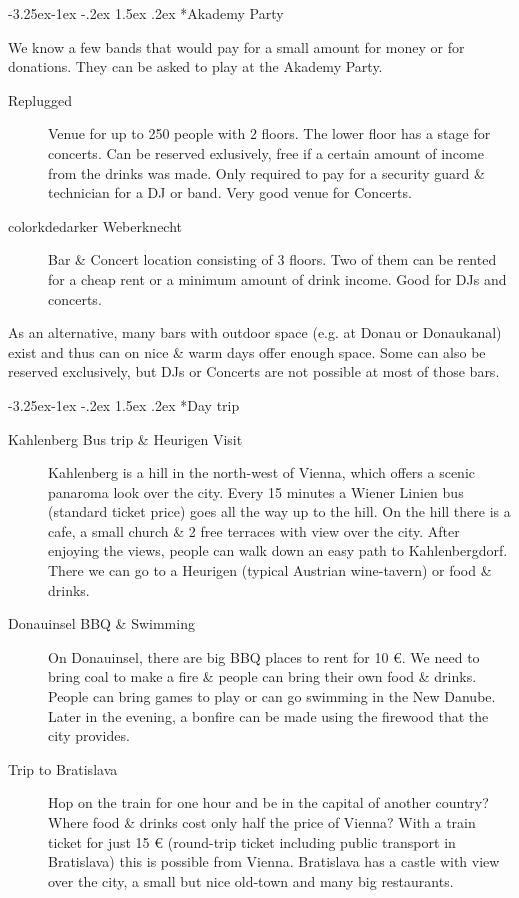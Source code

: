 \documentclass[10pt,a4paper]{article}
\makeatletter
\renewcommand\subsection{%
\@startsection{subsection}{2}{\z@}%
              {-3.25ex\@plus -1ex \@minus -.2ex}%
              {1.5ex \@plus .2ex}%
              {\color{kdelight}\sffamily\Large\bfseries}}
\makeatother
\begin{document}
\subsection*{Akademy Party}
We know a few bands that would pay for a small amount for money or for donations. They can be asked to play at the Akademy Party.

\begin{description}
\item[\color{kdedarker} Replugged] Venue for up to 250 people with 2 floors. The lower floor has a stage for concerts. Can be reserved exlusively, free if a certain amount of income from the drinks was made. Only required to pay for a security guard \& technician for a DJ or band. Very good venue for Concerts.
\item[color{kdedarker} Weberknecht] Bar \& Concert location consisting of 3 floors. Two of them can be rented for a cheap rent or a minimum amount of drink income. Good for DJs and concerts.
\end{description}

As an alternative, many bars with outdoor space (e.g. at Donau or Donaukanal) exist and thus can on nice \& warm days offer enough space. Some can also be reserved exclusively, but DJs or Concerts are not possible at most of those bars.


\subsection*{Day trip}
\begin{description}
\item[\color{kdedarker} Kahlenberg Bus trip \& Heurigen Visit] Kahlenberg is a hill in the north-west of Vienna, which offers a scenic panaroma look over the city. Every 15 minutes a Wiener Linien bus (standard ticket price) goes all the way up to the hill. On the hill there is a cafe, a small church \& 2 free terraces with view over the city. After enjoying the views, people can walk down an easy path to Kahlenbergdorf. There we can go to a Heurigen (typical Austrian wine-tavern) or food \& drinks.
\item[\color{kdedarker} Donauinsel BBQ \& Swimming] On Donauinsel, there are big BBQ places to rent for 10 \euro{}. We need to bring coal to make a fire \& people can bring their own food \& drinks. People can bring games to play or can go swimming in the New Danube. Later in the evening, a bonfire can be made using the firewood that the city provides.
\item[\color{kdedarker} Trip to Bratislava] Hop on the train for one hour and be in the capital of another country? Where food \& drinks cost only half the price of Vienna? With a train ticket for just 15 \euro{} (round-trip ticket including public transport in Bratislava) this is possible from Vienna. Bratislava has a castle with view over the city, a small but nice old-town and many big restaurants.
\end{description}
\end{document}

